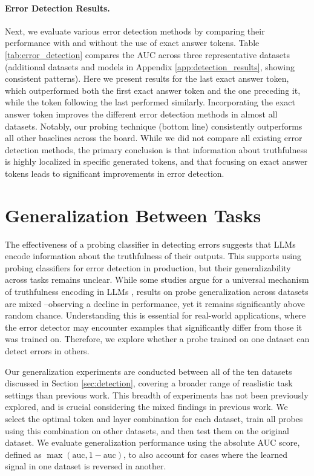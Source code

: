 \documentclass{article} %
\begin{document}
\paragraph{Error Detection Results.}

Next, we evaluate various error detection methods by comparing their performance with and without the use of exact answer tokens.
Table \ref{tab:error_detection} compares the AUC across three representative datasets (additional datasets and models in Appendix \ref{app:detection_results}, showing consistent patterns).
Here we present results for the last exact answer token, which outperformed both the first exact answer token and the one preceding it, while the token following the last performed similarly.
Incorporating the exact answer token improves the different error detection methods in almost all datasets. 
Notably, our probing technique (bottom line) consistently outperforms all other baselines across the board.
While we did not compare all existing error detection methods, the primary conclusion is that information about truthfulness is highly localized in specific generated tokens, and that focusing on exact answer tokens leads to significant improvements in error detection.


\section{Generalization Between Tasks}
\label{sec:generalization}

The effectiveness of a probing classifier in detecting errors suggests that LLMs encode information about the truthfulness of their outputs.
This supports using probing classifiers for error detection in production, but their generalizability across tasks remains unclear.
While some studies argue for a universal mechanism of truthfulness encoding in LLMs \citep{marks2023geometry, slobodkin-etal-2023-curious}, results on probe generalization across datasets are mixed \citep{kadavath2022language, marks2023geometry, chwang2023androids, slobodkin-etal-2023-curious, levinstein2024still}--observing a decline in performance, yet it remains significantly above random chance.
Understanding this is essential for real-world applications, where the error detector may encounter examples that significantly differ from those it was trained on.
Therefore, we explore whether a probe trained on one dataset can detect errors in others.

Our generalization experiments are conducted between all of the ten datasets discussed in Section \ref{sec:detection}, covering a broader range of reaslistic task settings than previous work.
This breadth of experiments has not been previously explored, and is crucial considering the mixed findings in previous work.
We select the optimal token and layer combination for each dataset, train all probes using this combination on other datasets, and then test them on the original dataset.
We evaluate generalization performance using the absolute AUC score, defined as $\max(\text{auc}, 1-\text{auc})$, to also account for cases where the learned signal in one dataset is reversed in another.
\end{document}
